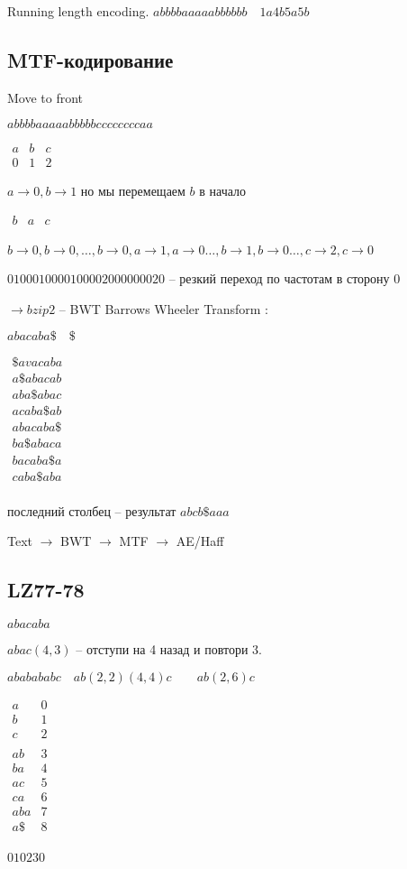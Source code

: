 \documentclass{book}
\theoremstyle{definition}
\begin{document}
   Running length encoding. $abbbbaaaaabbbbbb\quad 1a4b5a5b$
   \subsection{MTF-кодирование}
   Move to front

   $abbbbaaaaabbbbbccccccccaa$

   $\begin{array}{ccc}
       a&b&c\\0&1&2
   \end{array}$

   $a\to 0, b\to 1$ но мы перемещаем $b$  в начало

    $\begin{array}{ccc}
        b&a&c\\
    \end{array}$ 
    
    $b\to 0, b\to 0, \ldots, b\to 0, a\to 1, a\to 0 \ldots,b\to 1, b\to 0\ldots,c\to 2,c\to 0$

    $0100010000100002000000020$ -- резкий переход по частотам в сторону  $0$

     $\to bzip2$ -- BWT Barrows Wheeler Transform :

     $abacaba\$\quad \$$ 

      $\begin{array}{c}
          \$avacaba\\
          a\$abacab\\
          aba\$abac\\
          acaba\$ab\\
          abacaba\$\\
          ba\$abaca\\
          bacaba\$a\\
          caba\$aba\\
      \end{array}$

      последний столбец -- результат $abcb\$aaa$ 


      Text $\to $ BWT $\to $ MTF $\to $ AE/Haff

      \subsection{LZ77-78}

      $abacaba$

      $abac(4,3)$ -- отступи на 4 назад и повтори 3.

      $ababababc\quad ab(2,2)(4,4)c\qquad ab(2,6)c$

       $\begin{array}{cc}
           a&0\\b&1\\c&2\\&\\ab&3\\ba&4\\ac&5\\ca&6\\aba&7\\a\$&8\\
       \end{array}$

       $010230$
   
\end{document}

